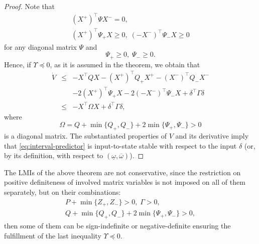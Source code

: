 \begin{proof}
	Note that
	\begin{gather*}
	(X^{+})^{\top}\Psi X^{-}=0,\\
	(X^{+})^{\top}\Psi_{+}X\geq0,\;(-X^{-})^{\top}\Psi_{-}X\geq0
	\end{gather*}
	for any diagonal matrix $\Psi$ and
	\[
	\Psi_{+}\geq0,\;\Psi_{-}\geq0.
	\]
	Hence, if $\Upsilon\preceq0$, as it is assumed in the theorem, we obtain that
	\begin{eqnarray*}
		\dot{V} & \leq & -X^{\top}QX-(X^{+})^{\top}Q_{+}X^{+}-(X^{-})^{\top}Q_{-}X^{-}\\
		&  & -2(X^{+})^{\top}\Psi_{+}X-2(-X^{-})^{\top}\Psi_{-}X+\delta^{\top}\Gamma\delta\\
		& \leq & -X^{\top}\Omega X+\delta^{\top}\Gamma\delta,
	\end{eqnarray*}
	where
	\[
	\Omega=Q+\min\{Q_{+},Q_{-}\}+2\min\{\Psi_{+},\Psi_{-}\}>0
	\]
	is a diagonal matrix. The substantiated properties of $V$ and its derivative imply that \eqref{eq:interval-predictor} is input-to-state stable \citep{Khalil2002} with respect to the input $\delta$ (or, by its definition, with respect to $(\underline{\omega},\overline{\omega})$).
\end{proof}
\begin{remark}
	\begin{leftbar}[remarkbar]
	The LMIs of the above theorem are not conservative, since the restriction on positive definiteness of involved matrix variables is not imposed on all of them separately, but on their combinations:
	\begin{gather*}
	P+\min\{Z_{+},Z_{-}\}>0,\;\Gamma>0,\\
	Q+\min\{Q_{+},Q_{-}\}+2\min\{\Psi_{+},\Psi_{-}\}>0,
	\end{gather*}
	then some of them can be sign-indefinite or negative-definite ensuring the fulfillment of the last inequality
	$
	\Upsilon\preceq0.
	$
	\end{leftbar}
\end{remark}


